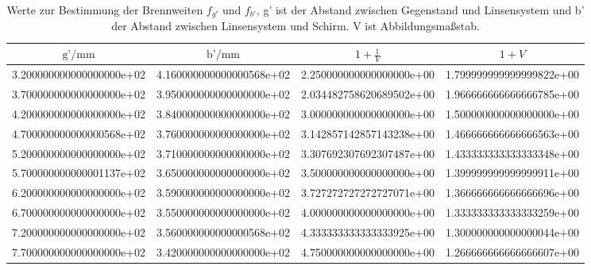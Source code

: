 \begin{table}
  \centering
  \begin{tabular}{S S S[round-precision=2] S[round-precision=2]}
    \toprule
    $\text{g'}/ \si{\milli\meter}$ &
    $\text{b'} /\si{\milli\meter}$ & ${1} {+}\frac{1}{V}$  & ${1} {+} V $\\
    \midrule
    3.200000000000000000e+02 & 4.160000000000000568e+02 & 2.250000000000000000e+00 & 1.799999999999999822e+00\\
    3.700000000000000000e+02 & 3.950000000000000000e+02 & 2.034482758620689502e+00 & 1.966666666666666785e+00\\
    4.200000000000000000e+02 & 3.840000000000000000e+02 & 3.000000000000000000e+00 & 1.500000000000000000e+00\\
    4.700000000000000568e+02 & 3.760000000000000000e+02 & 3.142857142857143238e+00 & 1.466666666666666563e+00\\
    5.200000000000000000e+02 & 3.710000000000000000e+02 & 3.307692307692307487e+00 & 1.433333333333333348e+00\\
    5.700000000000001137e+02 & 3.650000000000000000e+02 & 3.500000000000000000e+00 & 1.399999999999999911e+00\\
    6.200000000000000000e+02 & 3.590000000000000000e+02 & 3.727272727272727071e+00 & 1.366666666666666696e+00\\
    6.700000000000000000e+02 & 3.550000000000000000e+02 & 4.000000000000000000e+00 & 1.333333333333333259e+00\\
    7.200000000000000000e+02 & 3.560000000000000568e+02 & 4.333333333333333925e+00 & 1.300000000000000044e+00\\
    7.700000000000000000e+02 & 3.420000000000000000e+02 & 4.750000000000000000e+00 & 1.266666666666666607e+00\\
    \bottomrule
  \end{tabular}
  \caption{Werte zur Bestimmung der Brennweiten \texorpdfstring{$f_{g'}$}{math}
  und \texorpdfstring{$f_{b'}$}{math},
  g' ist der Abstand zwischen Gegenstand
  und Linsensystem und b' der Abstand zwischen Linsensystem und Schirm.
  V ist Abbildungsmaßstab.}
  \label{tab:abbe}
\end{table}
\FloatBarrier










%
